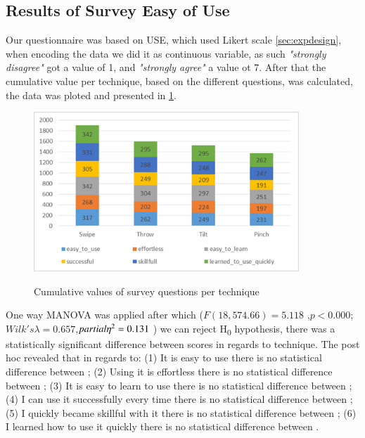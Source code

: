 \subsection{Results of Survey Easy of Use}
Our questionnaire was based on USE, which used Likert scale \ref*{sec:expdesign}, when encoding the data we did it as continuous variable, as such \emph{"strongly disagree"} got a value of 1, and \emph{"strongly agree"} a value ot 7. After that the cumulative value per technique, based on the different questions, was calculated, the data was ploted and presented in \ref{fig:surveyResult}. 
\begin{figure}[H]
	{\includegraphics[width = 1\columnwidth , height = 6cm ]{images/survey-data.png}} 
	\caption{
		Cumulative values of survey questions per technique
	}
	\label{fig:surveyResult}
\end{figure}

One way MANOVA was applied after which ($F(18, 574.66)=5.118$ ,$p<0.000$; $Wilk's \lambda =0.657$,$partial  \eta\textsuperscript{2} = 0.131$ ) we can reject H\textsubscript{0} hypothesis, there was a statistically significant difference between scores in regards to technique. 
The post hoc revealed that in regards to: (1) It is easy to use there is no statistical difference between \throw \tilt \pinch; (2) Using it is effortless there is no statistical difference between \throw \tilt \pinch; (3) It is easy to learn to use there is no statistical difference between \tilt \throw; (4) I can use it successfully every time there is no statistical difference between \tilt \pinch; (5) I quickly became skillful with it there is no statistical difference between \pinch \tilt; (6) I learned how to use it quickly  there is no statistical difference between \throw \tilt \pinch.